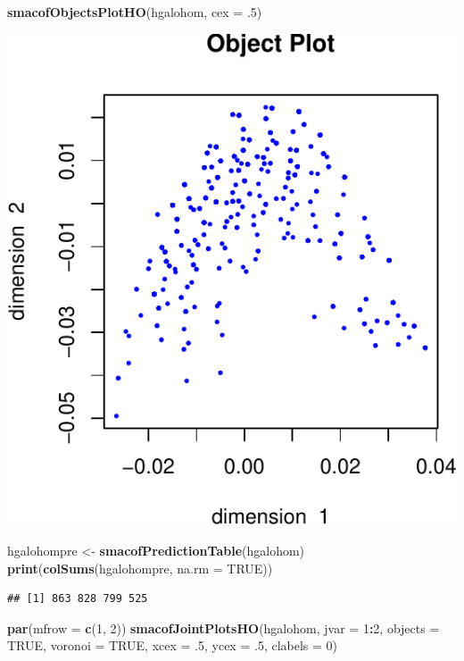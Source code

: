 \documentclass[
  12pt,
]{article}
\newenvironment{Shaded}{\begin{snugshade}}{\end{snugshade}}
\newcommand{\AttributeTok}[1]{\textcolor[rgb]{0.13,0.29,0.53}{#1}}
\newcommand{\ConstantTok}[1]{\textcolor[rgb]{0.56,0.35,0.01}{#1}}
\newcommand{\DecValTok}[1]{\textcolor[rgb]{0.00,0.00,0.81}{#1}}
\newcommand{\FunctionTok}[1]{\textcolor[rgb]{0.13,0.29,0.53}{\textbf{#1}}}
\newcommand{\NormalTok}[1]{#1}
\newcommand{\OtherTok}[1]{\textcolor[rgb]{0.56,0.35,0.01}{#1}}
\newcommand{\SpecialCharTok}[1]{\textcolor[rgb]{0.81,0.36,0.00}{\textbf{#1}}}
\begin{document}
\begin{Shaded}
\begin{Highlighting}[]
\FunctionTok{smacofObjectsPlotHO}\NormalTok{(hgalohom, }\AttributeTok{cex =}\NormalTok{ .}\DecValTok{5}\NormalTok{)}
\end{Highlighting}
\end{Shaded}

\includegraphics{smacofHO_files/figure-latex/unnamed-chunk-6-1.pdf}

\begin{Shaded}
\begin{Highlighting}[]
\NormalTok{hgalohompre }\OtherTok{\textless{}{-}} \FunctionTok{smacofPredictionTable}\NormalTok{(hgalohom)}
\FunctionTok{print}\NormalTok{(}\FunctionTok{colSums}\NormalTok{(hgalohompre, }\AttributeTok{na.rm =} \ConstantTok{TRUE}\NormalTok{))}
\end{Highlighting}
\end{Shaded}

\begin{verbatim}
## [1] 863 828 799 525
\end{verbatim}

\begin{Shaded}
\begin{Highlighting}[]
\FunctionTok{par}\NormalTok{(}\AttributeTok{mfrow =} \FunctionTok{c}\NormalTok{(}\DecValTok{1}\NormalTok{, }\DecValTok{2}\NormalTok{))}
\FunctionTok{smacofJointPlotsHO}\NormalTok{(hgalohom, }\AttributeTok{jvar =} \DecValTok{1}\SpecialCharTok{:}\DecValTok{2}\NormalTok{, }\AttributeTok{objects =} \ConstantTok{TRUE}\NormalTok{, }\AttributeTok{voronoi =} \ConstantTok{TRUE}\NormalTok{, }\AttributeTok{xcex =}\NormalTok{ .}\DecValTok{5}\NormalTok{, }\AttributeTok{ycex =}\NormalTok{ .}\DecValTok{5}\NormalTok{, }\AttributeTok{clabels =} \DecValTok{0}\NormalTok{)}
\end{Highlighting}
\end{Shaded}
\end{document}
